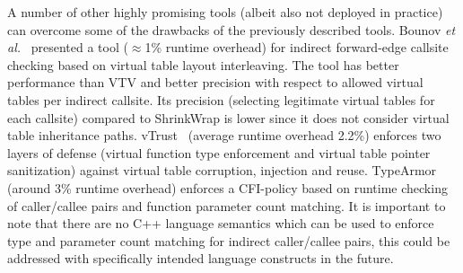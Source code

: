 A number of other highly promising tools (albeit also not deployed in practice) can overcome some of the drawbacks of the previously described tools. 
Bounov \textit{et al.}~\cite{bounov:interleaving} presented a tool ($\approx$1\% runtime overhead)
for indirect forward-edge callsite checking based on virtual table layout interleaving. The tool has better performance than VTV and better precision with
respect to allowed virtual tables per indirect callsite. Its precision (selecting legitimate virtual tables for each callsite) compared to ShrinkWrap is
lower since it does not consider virtual table inheritance paths. vTrust~\cite{zhang:vtrust} (average runtime overhead 2.2\%) enforces two layers of defense
(virtual function type enforcement and virtual table pointer sanitization) against virtual table corruption, injection and reuse. TypeArmor~\cite{veen:typearmor}
(around 3\% runtime overhead) enforces a CFI-policy based on runtime checking of caller/callee pairs and function parameter count matching. It is important to note 
that there are no C++ language semantics which can be used to enforce type and parameter count matching for indirect caller/callee pairs, this could be addressed
with specifically intended language constructs in the future.



